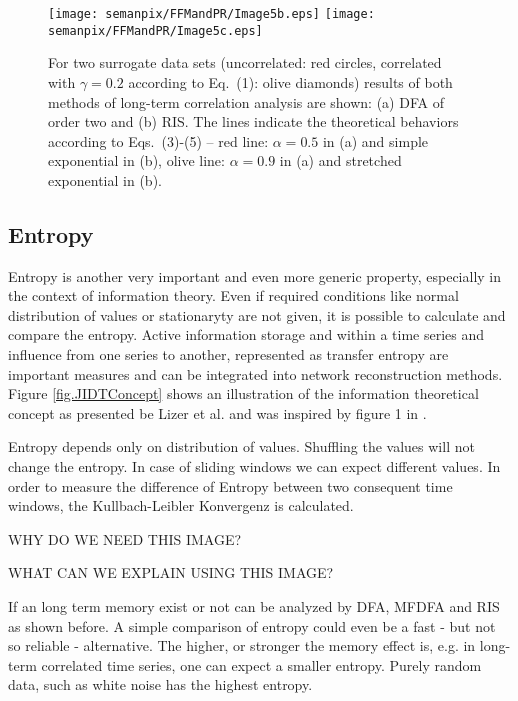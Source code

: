 \documentclass[a4paper,10pt]{scrbook}
\begin{document}
\begin{figure}[htp]
 \centering
 \texttt{[image: semanpix/FFMandPR/Image5b.eps]}
 \texttt{[image: semanpix/FFMandPR/Image5c.eps]}
 \caption{For two surrogate data sets (uncorrelated: red circles, correlated with $\gamma=0.2$ according to Eq.~(1): 
olive diamonds) results of both methods of long-term correlation analysis are shown: 
(a) DFA of order two and (b) RIS.  The lines indicate the theoretical behaviors according to Eqs.~(3)-(5) -- red line: 
$\alpha=0.5$ in (a) and simple exponential in (b), olive line: $\alpha=0.9$ in (a) and stretched exponential in (b).} 
\end{figure}


\subsection{Entropy}
Entropy is another very important and even more generic property, especially in the context of information theory. Even if required conditions like normal distribution of values or stationaryty are not given, it is possible to calculate and compare the entropy. Active information storage and within a time series and influence from one series to another, represented as transfer entropy are important measures and can be integrated into network reconstruction methods. Figure \ref{fig.JIDTConcept} shows an illustration of the information theoretical concept as presented be Lizer et al. and was inspired by figure 1 in \cite{Lizier2014}.

Entropy depends only on distribution of values. Shuffling the values will not change the entropy. In case of sliding windows we can expect different values. In order to measure the difference of Entropy between two consequent time windows, the Kullbach-Leibler Konvergenz is calculated.


%

\label{ext.fig.StructureVsFunction} 



WHY DO WE NEED THIS IMAGE?

WHAT CAN WE EXPLAIN USING THIS IMAGE?

If an long term memory exist or not can be analyzed by DFA, MFDFA and RIS as shown before. A simple comparison of entropy could even be a fast - but not so reliable - alternative. The higher, or stronger the memory effect is, e.g. in long-term correlated time series, one can expect a smaller entropy. Purely random data, such as white noise has the highest entropy.
\end{document}
